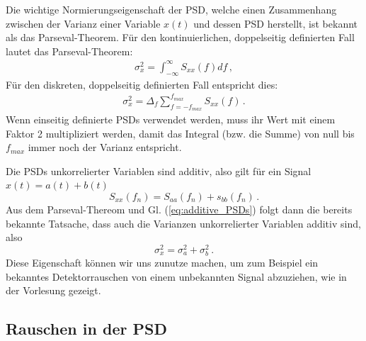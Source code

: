 Die wichtige Normierungseigenschaft der PSD, welche einen Zusammenhang zwischen der Varianz einer Variable $x(t)$ und dessen PSD herstellt, ist bekannt als das Parseval-Theorem. F\"ur 
den kontinuierlichen, doppelseitig definierten Fall lautet das Parseval-Theorem:
\begin{align}
\sigma_x^2 = \int_{- \infty}^\infty S_{xx} (f) df\,,
\label{eq:vl7-8}
\end{align}
F\"ur den diskreten, doppelseitig definierten Fall entspricht dies:
\begin{align}
\sigma_x^2 = \Delta_f \sum_{f = -f_{max}}^{f_{max}} S_{xx} (f)\,.
\label{eq:vl7-9}
\end{align}
Wenn einseitig definierte PSDs verwendet werden, muss ihr Wert mit einem Faktor 2 multipliziert werden, damit das Integral (bzw. die Summe) von null bis $f_{max}$ immer noch der Varianz entspricht.

Die PSDs unkorrelierter Variablen sind additiv, also gilt für ein Signal $x(t) = a(t) + b(t)$
\begin{equation}
        S_{xx}(f_n) = S_{aa}(f_n) + s_{bb}(f_n) \,.\label{eq:additive_PSDs}
\end{equation}
Aus dem Parseval-Thereom und Gl. (\ref{eq:additive_PSDs}) folgt dann die bereits bekannte Tatsache, dass auch die Varianzen unkorrelierter Variablen additiv sind, also 
\begin{equation}
    \sigma_x^2 = \sigma_a^2 + \sigma_b^2\,.
\end{equation}
Diese Eigenschaft können wir uns zunutze machen, um zum Beispiel ein bekanntes Detektorrauschen von einem unbekannten Signal abzuziehen, wie in der Vorlesung gezeigt. 

\subsection{Rauschen in der PSD}
\label{subsec:vl10}



